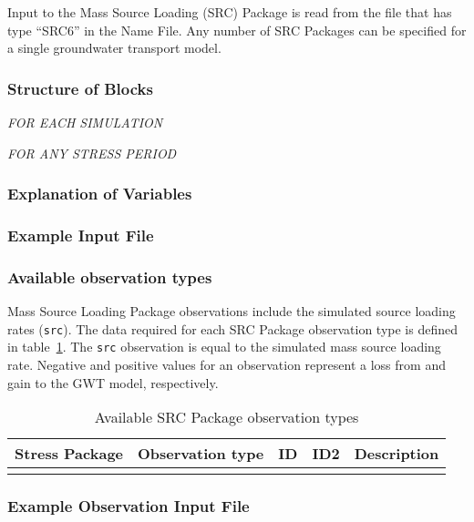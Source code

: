 Input to the Mass Source Loading (SRC) Package is read from the file that has type ``SRC6'' in the Name File.  Any number of SRC Packages can be specified for a single groundwater transport model.

\vspace{5mm}
\subsubsection{Structure of Blocks}
\vspace{5mm}

\noindent \textit{FOR EACH SIMULATION}


\vspace{5mm}
\noindent \textit{FOR ANY STRESS PERIOD}

\packageperioddescription

\vspace{5mm}
\subsubsection{Explanation of Variables}
\begin{description}

\end{description}

\vspace{5mm}
\subsubsection{Example Input File}


\vspace{5mm}
\subsubsection{Available observation types}
Mass Source Loading Package observations include the simulated source loading rates (\texttt{src}). The data required for each SRC Package observation type is defined in table~\ref{table:gwt-srcobstype}. The \texttt{src} observation is equal to the simulated mass source loading rate. Negative and positive values for an observation represent a loss from and gain to the GWT model, respectively.

\begin{longtable}{p{2cm} p{2.75cm} p{2cm} p{1.25cm} p{7cm}}
\caption{Available SRC Package observation types} \tabularnewline

\hline
\hline
\textbf{Stress Package} & \textbf{Observation type} & \textbf{ID} & \textbf{ID2} & \textbf{Description} \\
\hline
\endhead

\hline
\endfoot


\label{table:gwt-srcobstype}
\end{longtable}

\vspace{5mm}
\subsubsection{Example Observation Input File}

